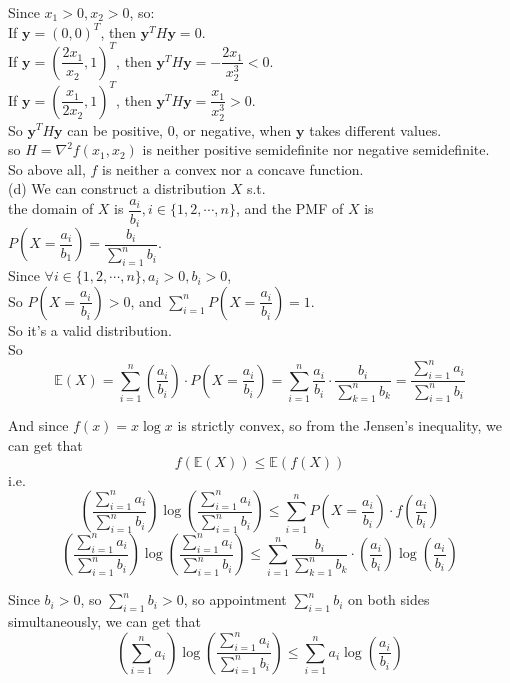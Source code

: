 \documentclass[10pt]{article}
\begin{document}
\begin{enumerate}[1.]
		  Since $x_1>0,x_2>0$, so:\\
		  If $\mathbf{y}=(0,0)^T$, then $\mathbf{y}^TH\mathbf{y}=0$.\\
		  If $\mathbf{y}=(\dfrac{2x_1}{x_2},1)^T$, then $\mathbf{y}^TH\mathbf{y}=-\dfrac{2x_1}{x_2^3}<0$.\\
		  If $\mathbf{y}=(\dfrac{x_1}{2x_2},1)^T$, then $\mathbf{y}^TH\mathbf{y}=\dfrac{x_1}{x_2^3}>0$.\\

		  So $\mathbf{y}^TH\mathbf{y}$ can be positive, $0$, or negative, when $\mathbf{y}$ takes different values.\\ 
		  so $H=\nabla^2f(x_1,x_2)$ is neither positive semidefinite nor negative semidefinite.\\
		
		  So above all, $f$ is neither a convex nor a concave function.\\

		  (d) We can construct a distribution $X$ s.t.\\
		  the domain of $X$ is $\dfrac{a_i}{b_i}, i\in\{1,2,\cdots,n\}$, and the PMF of $X$ is $P(X=\dfrac{a_i}{b_1})=\dfrac{b_i}{\sum\limits_{i=1}^{n}b_i}$.\\
		  Since $\forall i \in\{1,2,\cdots,n\}, a_i > 0, b_i > 0$,\\
		  So $P(X=\dfrac{a_i}{b_i}) > 0$, and $\sum\limits_{i=1}^{n}P(X=\dfrac{a_i}{b_i})=1$.\\
		  So it's a valid distribution.\\
		  So $$\mathbb{E}(X)=\sum\limits_{i=1}^{n} (\dfrac{a_i}{b_i})\cdot P(X=\dfrac{a_i}{b_i})=\sum\limits_{i=1}^{n} \dfrac{a_i}{b_i}\cdot \dfrac{b_i}{\sum\limits_{k=1}^{n}b_k}=\dfrac{\sum\limits_{i=1}^{n}a_i}{\sum\limits_{i=1}^{n}b_i}$$

		  And since $f(x)=x\log x$ is strictly convex, so from the Jensen's inequality, we can get that\\
		  $$f(\mathbb{E}(X)) \leq \mathbb{E}(f(X))$$
		  i.e.
		  $$\left(\dfrac{\sum\limits_{i=1}^{n}a_i}{\sum\limits_{i=1}^{n}b_i}\right)\log \left(\dfrac{\sum\limits_{i=1}^{n}a_i}{\sum\limits_{i=1}^{n}b_i}\right) 
		  \leq \sum\limits_{i=1}^{n} P(X=\dfrac{a_i}{b_i})\cdot f(\dfrac{a_i}{b_i})$$
		  $$\left(\dfrac{\sum\limits_{i=1}^{n}a_i}{\sum\limits_{i=1}^{n}b_i}\right)\log \left(\dfrac{\sum\limits_{i=1}^{n}a_i}{\sum\limits_{i=1}^{n}b_i}\right)
		  \leq \sum\limits_{i=1}^{n} \dfrac{b_i}{\sum\limits_{k=1}^nb_k}\cdot(\dfrac{a_i}{b_i})\log(\dfrac{a_i}{b_i})$$
		  
		  Since $b_i>0$, so $\sum\limits_{i=1}^nb_i>0$, so appointment $\sum\limits_{i=1}^nb_i$ on both sides simultaneously, we can get that
		  $$\left(\sum\limits_{i=1}^{n} a_i\right) \log \left(\dfrac{\sum\limits_{i=1}^{n} a_i}{\sum\limits_{i=1}^{n} b_i}\right)
		  \leq \sum\limits_{i=1}^{n} a_i\log \left(\dfrac{a_i}{b_i}\right)$$
		  

\end{enumerate}
\end{document}
